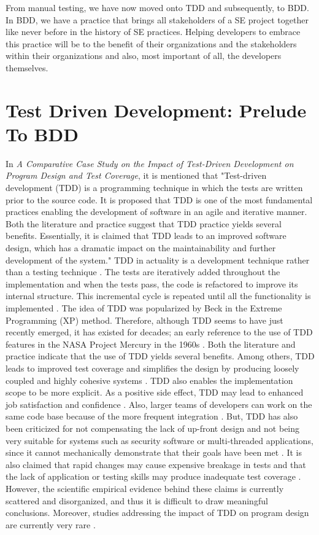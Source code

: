 \documentclass[conference, onecolumn, a4, 12pt]{IEEEtran}
\begin{document}
From manual testing, we have now moved onto TDD and subsequently, to BDD. In BDD, we have a practice that brings all stakeholders of a SE project together like never before in the history of SE practices. Helping developers to embrace this practice will be to the benefit of their organizations and the stakeholders within their organizations and also, most important of all, the developers themselves.\newline

\section{Test Driven Development: Prelude To BDD}
In \textit{A Comparative Case Study on the Impact of Test-Driven Development on Program Design and Test Coverage}, it is mentioned that "Test-driven development (TDD) is a programming technique in which the tests are written prior to the source code. It is proposed that TDD is one of the most fundamental practices enabling the development of software in an agile and iterative manner. Both the literature and practice suggest that TDD practice yields several benefits. Essentially, it is claimed that TDD leads to an improved software design, which has a dramatic impact on the maintainability and further development of the system." \cite{b6} TDD in actuality is a development technique rather than a testing technique \cite{b7}. The tests are iteratively added throughout the implementation and when the tests pass, the code is refactored to improve its internal structure. This incremental cycle is repeated until all the functionality is implemented \cite{b8}. The idea of TDD was popularized by Beck \cite{b9} in the Extreme Programming (XP) method. Therefore, although TDD seems to have just recently emerged, it has existed for decades; an early reference to the use of TDD features in the NASA Project Mercury in the 1960s \cite{b10}. 
Both the literature and practice indicate that the use of TDD yields several benefits. Among others, TDD leads to improved test coverage \cite{b8} and simplifies the design by producing loosely coupled and highly cohesive systems \cite{b11}. TDD also enables the implementation scope to be more explicit. As a positive side effect, TDD may lead to enhanced job satisfaction and confidence \cite{b11}. Also, larger teams of developers can work on the same code base because of the more frequent integration \cite{b7}.  But, TDD has also been criticized for not compensating the lack of up-front design and not being very suitable for systems such as security software or multi-threaded applications, since it cannot mechanically demonstrate that their goals have been met \cite{b12}. It is also claimed that rapid changes may cause expensive breakage in tests and that the lack of application or testing skills may produce inadequate test coverage \cite{b13}. However, the scientific empirical evidence behind these claims is currently scattered and disorganized, and thus it is difficult to draw meaningful conclusions. Moreover, studies addressing the impact of TDD on program design are currently very rare \cite{b6}.
\end{document}
